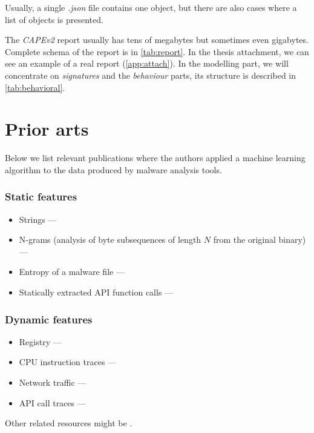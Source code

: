 Usually, a single \emph{.json} file contains one object, but there are also cases where a list of objects is presented.

The \emph{CAPEv2} report usually has tens of megabytes but sometimes even gigabytes. Complete schema of the report is in \ref{tab:report}. In the thesis attachment, we can see an example of a real report (\ref{app:attach}). In the modelling part, we will concentrate on \emph{signatures} and the \emph{behaviour} parts, its structure is described in \ref{tab:behavioral}.

\section{Prior arts}
Below we list relevant publications where the authors applied a machine learning algorithm to the data produced by malware analysis tools.
\subsubsection*{Static features}
\begin{itemize}
  \itemsep0em 
  \item Strings ---  \cite{Lee2011}
  \item N-grams (analysis of byte subsequences of length $N$ from the original binary) ---  \cite{Fuyong2017}
  \item Entropy of a malware file ---  \cite{Wojnowicz2018}
  \item Statically extracted API function calls ---  \cite{Ahmadi2016}
\end{itemize}

\subsubsection*{Dynamic features}
\begin{itemize}
  \itemsep0em 
  \item Registry ---  \cite{Ghiasi2015}
  \item CPU instruction traces ---  \cite{Carlin2017}
  \item Network traffic ---  \cite{Boukhtouta2015}
  \item API call traces ---   \cite{Galal2015}
\end{itemize}

Other related resources might be \cite{Singh2020, Sethi2019, Abdessadki2019, Gibert2020}.